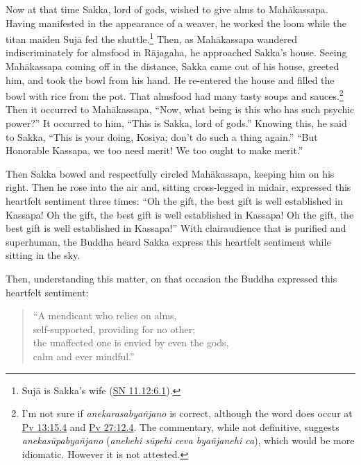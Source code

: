 \documentclass[12pt,openany]{book}%
\begin{document}
Now at that time Sakka, lord of gods, wished to give alms to \textsanskrit{Mahākassapa}. Having manifested in the appearance of a weaver, he worked the loom while the titan maiden \textsanskrit{Sujā} fed the shuttle.\footnote{\textsanskrit{Sujā} is Sakka’s wife (\href{https://suttacentral.net/sn11.12/en/sujato\#6.1}{SN 11.12:6.1}). } Then, as \textsanskrit{Mahākassapa} wandered indiscriminately for almsfood in \textsanskrit{Rājagaha}, he approached Sakka’s house. Seeing \textsanskrit{Mahākassapa} coming off in the distance, Sakka came out of his house, greeted him, and took the bowl from his hand. He re-entered the house and filled the bowl with rice from the pot. That almsfood had many tasty soups and sauces.\footnote{I’m not sure if \textit{\textsanskrit{anekarasabyañjano}} is correct, although the word does occur at \href{https://suttacentral.net/pv13/pli/ms\#15.4}{Pv 13:15.4} and \href{https://suttacentral.net/pv27/pli/ms\#12.4}{Pv 27:12.4}. The commentary, while not definitive, suggests \textit{\textsanskrit{anekasūpabyañjano}} (\textit{anekehi \textsanskrit{sūpehi} ceva \textsanskrit{byañjanehi} ca}), which would be more idiomatic. However it is not attested. } Then it occurred to \textsanskrit{Mahākassapa}, “Now, what being is this who has such psychic power?” It occurred to him, “This is Sakka, lord of gods.” Knowing this, he said to Sakka, “This is your doing, Kosiya; don’t do such a thing again.” “But Honorable Kassapa, we too need merit! We too ought to make merit.” 

Then Sakka bowed and respectfully circled \textsanskrit{Mahākassapa}, keeping him on his right. Then he rose into the air and, sitting cross-legged in midair, expressed this heartfelt sentiment three times: “Oh the gift, the best gift is well established in Kassapa! Oh the gift, the best gift is well established in Kassapa! Oh the gift, the best gift is well established in Kassapa!” With clairaudience that is purified and superhuman, the Buddha heard Sakka express this heartfelt sentiment while sitting in the sky. 

Then, understanding this matter, on that occasion the Buddha expressed this heartfelt sentiment: 

\begin{verse}%
“A mendicant who relies on alms, \\
self-supported, providing for no other; \\
the unaffected one is envied by even the gods, \\
calm and ever mindful.” 

%
\end{verse}
\end{document}
